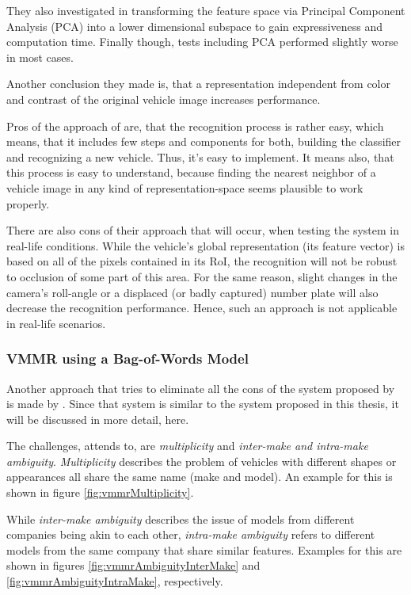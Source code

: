 They also investigated in transforming the feature space via Principal Component Analysis (PCA) into a lower dimensional subspace to gain expressiveness and computation time. Finally though, tests including PCA performed slightly worse in most cases.

Another conclusion they made is, that a representation independent from color and contrast of the original vehicle image increases performance.

Pros of the approach of \citeauthor{petrovic2004analysis} are, that the recognition process is rather easy, which means, that it includes few steps and components for both, building the classifier and recognizing a new vehicle. Thus, it's easy to implement. It means also, that this process is easy to understand, because finding the nearest neighbor of a vehicle image in any kind of representation-space seems plausible to work properly.

There are also cons of their approach that will occur, when testing the system in real-life conditions. While the vehicle's global representation (its feature vector) is based on all of the pixels contained in its RoI, the recognition will not be robust to occlusion of some part of this area. For the same reason, slight changes in the camera's roll-angle or a displaced (or badly captured) number plate will also decrease the recognition performance. Hence, such an approach is not applicable in real-life scenarios.

\subsubsection{VMMR using a Bag-of-Words Model}
Another approach that tries to eliminate all the cons of the system proposed by \citeauthor{petrovic2004analysis} is made by \citeauthor{siddiqui2015robust} \citep{siddiqui2015robust}. Since that system is similar to the system proposed in this thesis, it will be discussed in more detail, here.

The challenges, \citep{siddiqui2015robust} attends to, are \emph{multiplicity} and \emph{inter-make and intra-make ambiguity}. \emph{Multiplicity} describes the problem of vehicles with different shapes or appearances all share the same name (make and model). An example for this is shown in figure \ref{fig:vmmrMultiplicity}.

While \emph{inter-make ambiguity} describes the issue of models from different companies being akin to each other, \emph{intra-make ambiguity} refers to different models from the same company that share similar features. Examples for this are shown in figures \ref{fig:vmmrAmbiguityInterMake} and \ref{fig:vmmrAmbiguityIntraMake}, respectively.

